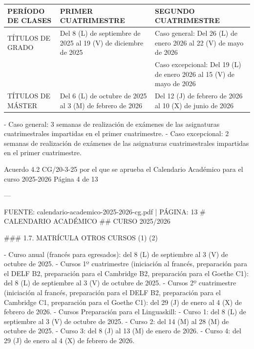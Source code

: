 \documentclass{article}
\begin{document}
\begin{itemize}
\begin{itemize}
\begin{scriptsize}
                  \vspace{0.4cm}
                  \begin{table}[h!]\centering\renewcommand{\arraystretch}{1.3}
                    \begin{tabular}{|p{}|p{}|p{}|}\hline
                      PERÍODO DE CLASES & PRIMER CUATRIMESTRE                                            & SEGUNDO CUATRIMESTRE                                                 \\\hline
                      TÍTULOS DE GRADO  & Del 8 (L) de septiembre de 2025 al 19 (V) de diciembre de 2025 & Caso general: Del 26 (L) de enero 2026 al 22 (V) de mayo de 2026     \\\hline
                                        &                                                                & Caso excepcional: Del 19 (L) de enero 2026 al 15 (V) de mayo de 2026 \\\hline
                      TÍTULOS DE MÁSTER & Del 6 (L) de octubre de 2025 al 3 (M) de febrero de 2026       & Del 12 (J) de febrero de 2026 al 10 (X) de junio de 2026             \\\hline
                    \end{tabular}\end{table}
                  \vspace{0.4cm}

                  - Caso general: 3 semanas de realización de exámenes de las asignaturas cuatrimestrales impartidas en el primer cuatrimestre.
                  - Caso excepcional: 2 semanas de realización de exámenes de las asignaturas cuatrimestrales impartidas en el primer cuatrimestre.

                  Acuerdo 4.2 CG/20-3-25 por el que se aprueba el Calendario Académico para el curso 2025-2026  Página 4 de 13

                  ---

                  FUENTE: calendario-academico-2025-2026-cg.pdf | PÁGINA: 13
                  \# CALENDARIO ACADÉMICO
                  \#\# CURSO 2025/2026

                  \#\#\# 1.7. MATRÍCULA OTROS CURSOS (1) (2)

                  - Curso anual (francés para egresados): del 8 (L) de septiembre al 3 (V) de octubre de 2025.
                  - Cursos 1º cuatrimestre (iniciación al francés, preparación para el DELF B2, preparación para el Cambridge B2, preparación para el Goethe C1): del 8 (L) de septiembre al 3 (V) de octubre de 2025.
                  - Cursos 2º cuatrimestre (iniciación al francés, preparación para el DELF B2, preparación para el Cambridge C1, preparación para el Goethe C1): del 29 (J) de enero al 4 (X) de febrero de 2026.
                  - Cursos Preparación para el Linguaskill:
                  - Curso 1: del 8 (L) de septiembre al 3 (V) de octubre de 2025.
                  - Curso 2: del 14 (M) al 28 (M) de octubre de 2025.
                  - Curso 3: del 8 (J) al 13 (M) de enero de 2026.
                  - Curso 4: del 29 (J) de enero al 4 (X) de febrero de 2026.


\end{scriptsize}
\end{itemize}
\end{itemize}
\end{document}
